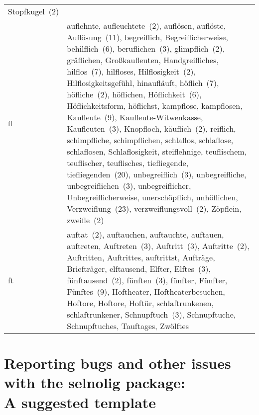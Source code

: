 \documentclass[11pt]{article}
\newcommand{\pkg}[1]{\textsf{#1}}
\begin{document}
{\begin{tabularx}{\textwidth}{@{}lX@{}}
Stopfkugel~(2)\\
fl &
auflehnte,
aufleuchtete~(2),
auflösen,
auflöste,
Auflösung~(11),
begreiflich,
Begreiflicherweise,
be\-hilf\-lich~(6),
beruflichen~(3),
glimpflich~(2),
gräflichen,
Großkaufleuten,
Handgreifliches,
hilflos~(7),
hilfloses,
Hilf\-losigkeit~(2),
Hilflosigkeitsgefühl,
hinaufläuft,
höflich~(7),
höfliche~(2),
höflichen,
Höflichkeit~(6),
Höflichkeitsform,
höflichst,
kampflose,
kampflosen,
Kaufleute~(9),
Kaufleute-Witwenkasse,
Kauf\-leuten~(3),
Knopfloch,
käuflich~(2),
reiflich,
schimpfliche,
schimpflichen,
schlaflos,
schlaflose,
schlaflosen,
Schlaflosigkeit,
steiflehnige,
teuflischem,
teuflischer,
teuflisches,
tiefliegende,
tiefliegenden~(20),
unbegreif\-lich~(3),
unbegreifliche,
unbegreiflichen~(3),
unbegreiflicher,
Unbegreiflicherweise,
unerschöpflich,
unhöflichen,
Verzweiflung~(23),
verzweiflungsvoll~(2),
Zöpflein,
zweifle~(2)\\
ft &
auftat~(2),
auftauchen,
auftauchte,
auftauen,
auftreten,
Auftreten~(3),
Auftritt~(3),
Auftritte~(2),
Auftritten,
Auftrittes,
auftrittst,
Aufträge,
Briefträger,
elftausend,
Elfter,
Elftes~(3),
fünftausend~(2),
fünften~(3),
fünfter,
Fünfter,
Fünftes~(9),
Hoftheater,
Hoftheaterbesuchen,
Hoftore,
Hoftore,
Hoftür,
schlaftrunkenen,
schlaftrunkener,
Schnupftuch~(3),
Schnupftuche,
Schnupftuches,
Tauftages,
Zwölftes\\
\bottomrule
\end{tabularx}
}

\selnoligoff

\clearpage
\section[Reporting bugs and other issues with the selnolig package: A suggested template]{Reporting bugs and other issues with the \pkg{selnolig} package:\\A suggested template} \label{sec:template}

\end{document}
